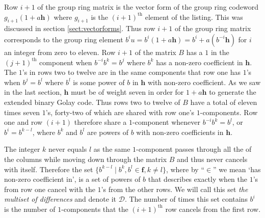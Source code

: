 Row $i+1$ of the group ring matrix is the vector form of the group ring codeword $g_{i+1} (1 + a \mathbf{h})$ where $g_{i+1}$ is the $(i+1)^{\textrm{th}}$ element of the listing.
This was discussed in section \ref{sect:vectorforms}.
Thus row $i+1$ of the group ring matrix corresponds to the group ring element $b^iu = b^i( 1 + a \mathbf{h} ) = b^i + a (b^{-i} \mathbf{h})$ for $i$ an integer from zero to eleven.
Row $i+1$ of the matrix $B$ has a $1$ in the $(j+1)^{\textrm{th}}$ component when $b^{-i}b^k = b^j$ where $b^k$ has a non-zero coefficient in $\mathbf{h}$.
The $1$'s in rows two to twelve are in the same components that row one has $1$'s when $b^j = b^l$ where $b^l$ is some power of $b$ in $\mathbf{h}$ with non-zero coefficient.
As we saw in the last section, $\mathbf{h}$ must be of weight seven in order for $1 + a \mathbf{h}$ to generate the extended binary Golay code.
Thus rows two to twelve of $B$ have a total of eleven times seven $1$'s, forty-two of which are shared with row one's $1$-components.
Row one and row $(i+1)$ therefore share a $1$-component whenever $b^{-i}b^k = b^l$, or $b^i = b^{k-l}$, where $b^k$ and $b^l$ are powers of $b$ with non-zero coefficients in $\mathbf{h}$.

The integer $k$ never equals $l$ as the same $1$-component passes through all the of the columns while moving down through the matrix $B$ and thus never cancels with itself.
Therefore the set $\{ b^{k-l} \mid b^k , b^l \in \mathbf{f} , k \neq l \}$, where by ``$\in$'' we mean `has non-zero coefficient in', is a set of powers of $b$ that describes exactly when the $1$'s from row one cancel with the $1$'s from the other rows.
We will call this set \emph{the multiset of differences} and denote it $\mathcal{D}$.
The number of times this set contains $b^i$ is the number of $1$-components that the $(i+1)^{\textrm{th}}$ row cancels from the first row.

